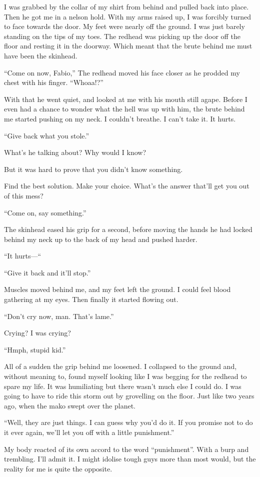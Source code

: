 \documentclass[oneside]{book}
\begin{document}
I was grabbed by the collar of my shirt from behind and pulled back into place. Then he got me in a nelson hold. With my arms raised up, I was forcibly turned to face towards the door. My feet were nearly off the ground. I was just barely standing on the tips of my toes. The redhead was picking up the door off the floor and resting it in the doorway. Which meant that the brute behind me must have been the skinhead.

“Come on now, Fabio,” The redhead moved his face closer as he prodded my chest with his finger. “Whoaa!?”

With that he went quiet, and looked at me with his mouth still agape. Before I even had a chance to wonder what the hell was up with him, the brute behind me started pushing on my neck. I couldn’t breathe. I can’t take it. It hurts.

“Give back what you stole.”

What’s he talking about? Why would I know?

But it was hard to prove that you didn’t know something.

Find the best solution. Make your choice. What’s the answer that’ll get you out of this mess?

“Come on, say something.”

The skinhead eased his grip for a second, before moving the hands he had locked behind my neck up to the back of my head and pushed harder.

“It hurts—“

“Give it back and it’ll stop.”

Muscles moved behind me, and my feet left the ground. I could feel blood gathering at my eyes. Then finally it started flowing out.

“Don’t cry now, man. That’s lame.”

Crying? I was crying?

“Hmph, stupid kid.”

All of a sudden the grip behind me loosened. I collapsed to the ground and, without meaning to, found myself looking like I was begging for the redhead to spare my life. It was humiliating but there wasn’t much else I could do. I was going to have to ride this storm out by grovelling on the floor. Just like two years ago, when the mako swept over the planet.

“Well, they are just things. I can guess why you’d do it. If you promise not to do it ever again, we’ll let you off with a little punishment.”

My body reacted of its own accord to the word “punishment”. With a burp and trembling. I’ll admit it. I might idolise tough guys more than most would, but the reality for me is quite the opposite.
\end{document}
